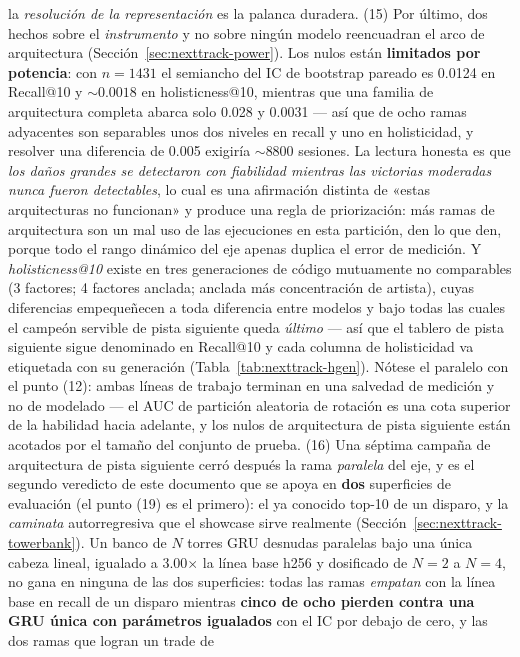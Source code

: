 \documentclass[11pt]{article}
\begin{document}
la \emph{resolución de la representación} es la palanca duradera.
(15) Por último, dos hechos sobre el \emph{instrumento} y no sobre ningún modelo
reencuadran el arco de arquitectura (Sección~\ref{sec:nexttrack-power}). Los
nulos están \textbf{limitados por potencia}: con $n=\num{1431}$ el semiancho del
IC de bootstrap pareado es \num{0.0124} en Recall@10 y ${\sim}\num{0.0018}$ en
holisticness@10, mientras que una familia de arquitectura completa abarca solo
\num{0.028} y \num{0.0031} --- así que de ocho ramas adyacentes son separables
unos dos niveles en recall y uno en holisticidad, y resolver una diferencia de
\num{0.005} exigiría ${\sim}\num{8800}$ sesiones. La lectura honesta es que
\emph{los daños grandes se detectaron con fiabilidad mientras las victorias
moderadas nunca fueron detectables}, lo cual es una afirmación distinta de «estas
arquitecturas no funcionan» y produce una regla de priorización: más ramas de
arquitectura son un mal uso de las ejecuciones en esta partición, den lo que den,
porque todo el rango dinámico del eje apenas duplica el error de medición. Y
\emph{holisticness@10} existe en tres generaciones de código mutuamente no
comparables (3 factores; 4 factores anclada; anclada más concentración de
artista), cuyas diferencias empequeñecen a toda diferencia entre modelos y bajo
todas las cuales el campeón servible de pista siguiente queda \emph{último} ---
así que el tablero de pista siguiente sigue denominado en Recall@10 y cada
columna de holisticidad va etiquetada con su generación
(Tabla~\ref{tab:nexttrack-hgen}). Nótese el paralelo con el punto (12): ambas
líneas de trabajo terminan en una salvedad de medición y no de modelado --- el AUC
de partición aleatoria de rotación es una cota superior de la habilidad hacia
adelante, y los nulos de arquitectura de pista siguiente están acotados por el
tamaño del conjunto de prueba.
(16) Una séptima campaña de arquitectura de pista siguiente cerró después la rama
\emph{paralela} del eje, y es el segundo veredicto de este documento que se apoya
en \textbf{dos} superficies de evaluación (el punto (19) es el primero): el ya
conocido top-10 de un disparo, y
la \emph{caminata} autorregresiva que el showcase sirve realmente
(Sección~\ref{sec:nexttrack-towerbank}). Un banco de $N$ torres GRU desnudas
paralelas bajo una única cabeza lineal, igualado a \num{3.00}$\times$ la línea
base h256 y dosificado de $N=2$ a $N=4$, no gana en ninguna de las dos
superficies: todas las ramas \emph{empatan} con la línea base en recall de un
disparo mientras \textbf{cinco de ocho pierden contra una GRU única con parámetros
igualados} con el IC por debajo de cero, y las dos ramas que logran un trade de
\end{document}
